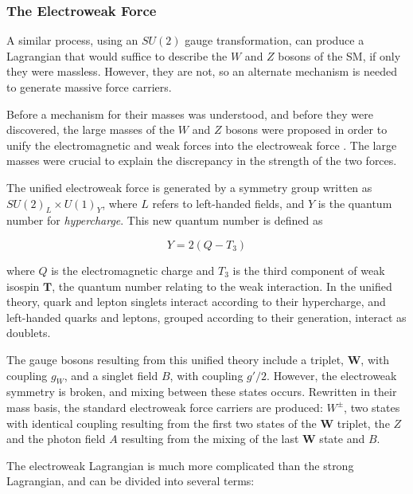 

\subsubsection{The Electroweak Force}
\label{sec:ew}

A similar process, using an $SU(2)$ gauge transformation, can produce a Lagrangian that would suffice to describe the $W$ and $Z$ bosons of the \ac{SM}, if only they were massless. However, they are not, so an alternate mechanism is needed to generate massive force carriers. 

Before a mechanism for their masses was understood, and before they were discovered, the large masses of the $W$ and $Z$ bosons were proposed in order to unify the electromagnetic and weak forces into the electroweak force \cite{Griffiths:111880}. The large masses were crucial to explain the discrepancy in the strength of the two forces. 

The unified electroweak force is generated by a symmetry group written as ${SU(2)_L \times U(1)_Y}$, where $L$ refers to left-handed fields, and $Y$ is the quantum number for \textit{hypercharge}. This new quantum number is defined as 

\begin{equation}
Y = 2(Q - T_3)
\end{equation}

where $Q$ is the electromagnetic charge and $T_3$ is the third component of weak isospin $\bm{T}$, the quantum number relating to the weak interaction. In the unified theory, quark and lepton singlets interact according to their hypercharge, and left-handed quarks and leptons, grouped according to their generation, interact as doublets. 

The gauge bosons resulting from this unified theory include a triplet, $\bm{W}$, with coupling $g_W$, and a singlet field $B$, with coupling $g'/2$. However, the electroweak symmetry is broken, and mixing between these states occurs. Rewritten in their mass basis, the standard electroweak force carriers are produced: $W^\pm$, two states with identical coupling resulting from the first two states of the $\bm{W}$ triplet, the $Z$ and the photon field $A$ resulting from the mixing of the last $\bm{W}$ state and $B$. 

The electroweak Lagrangian is much more complicated than the strong Lagrangian, and can be divided into several terms:


